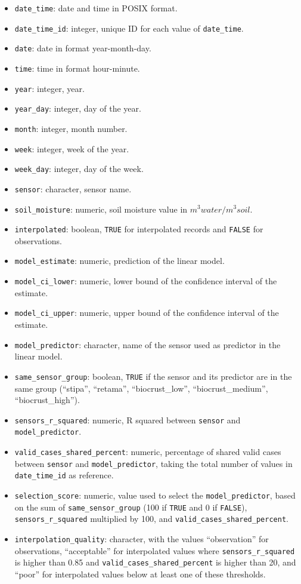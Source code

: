 \documentclass[]{article}
\providecommand{\tightlist}{%
  \setlength{\itemsep}{0pt}\setlength{\parskip}{0pt}}
\begin{document}
\begin{itemize}
\tightlist
\item
  \texttt{date\_time}: date and time in POSIX format.
\item
  \texttt{date\_time\_id}: integer, unique ID for each value of
  \texttt{date\_time}.
\item
  \texttt{date}: date in format year-month-day.
\item
  \texttt{time}: time in format hour-minute.
\item
  \texttt{year}: integer, year.
\item
  \texttt{year\_day}: integer, day of the year.
\item
  \texttt{month}: integer, month number.
\item
  \texttt{week}: integer, week of the year.
\item
  \texttt{week\_day}: integer, day of the week.
\item
  \texttt{sensor}: character, sensor name.
\item
  \texttt{soil\_moisture}: numeric, soil moisture value in
  \(m^{3} water /m^{3} soil\).
\item
  \texttt{interpolated}: boolean, \texttt{TRUE} for interpolated records
  and \texttt{FALSE} for observations.
\item
  \texttt{model\_estimate}: numeric, prediction of the linear model.
\item
  \texttt{model\_ci\_lower}: numeric, lower bound of the confidence
  interval of the estimate.
\item
  \texttt{model\_ci\_upper}: numeric, upper bound of the confidence
  interval of the estimate.
\item
  \texttt{model\_predictor}: character, name of the sensor used as
  predictor in the linear model.
\item
  \texttt{same\_sensor\_group}: boolean, \texttt{TRUE} if the sensor and
  its predictor are in the same group (``stipa'', ``retama'',
  ``biocrust\_low'', ``biocrust\_medium'', ``biocrust\_high'').
\item
  \texttt{sensors\_r\_squared}: numeric, R squared between
  \texttt{sensor} and \texttt{model\_predictor}.
\item
  \texttt{valid\_cases\_shared\_percent}: numeric, percentage of shared
  valid cases between \texttt{sensor} and \texttt{model\_predictor},
  taking the total number of values in \texttt{date\_time\_id} as
  reference.
\item
  \texttt{selection\_score}: numeric, value used to select the
  \texttt{model\_predictor}, based on the sum of
  \texttt{same\_sensor\_group} (100 if \texttt{TRUE} and 0 if
  \texttt{FALSE}), \texttt{sensors\_r\_squared} multiplied by 100, and
  \texttt{valid\_cases\_shared\_percent}.
\item
  \texttt{interpolation\_quality}: character, with the values
  ``observation'' for observations, ``acceptable'' for interpolated
  values where \texttt{sensors\_r\_squared} is higher than 0.85 and
  \texttt{valid\_cases\_shared\_percent} is higher than 20, and ``poor''
  for interpolated values below at least one of these thresholds.
\end{itemize}
\end{document}
